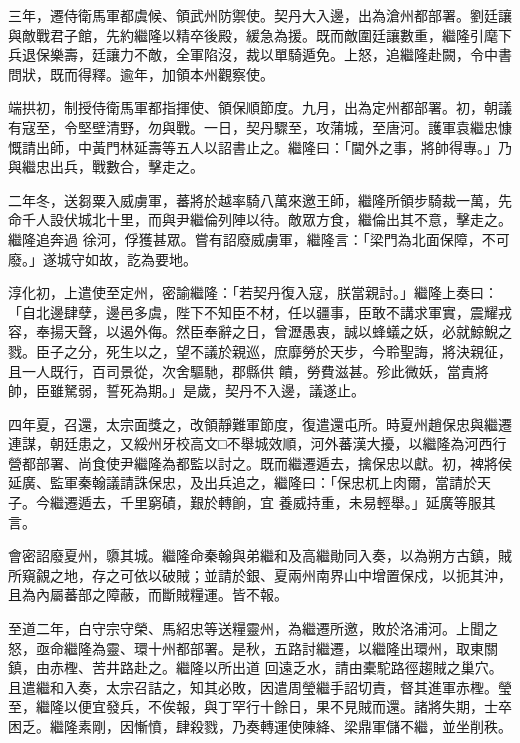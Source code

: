 \begin{pinyinscope}
 三年，遷侍衛馬軍都虞候、領武州防禦使。契丹大入邊，出為滄州都部署。劉廷讓與敵戰君子館，先約繼隆以精卒後殿，緩急為援。既而敵圍廷讓數重，繼隆引麾下兵退保樂壽，廷讓力不敵，全軍陷沒，裁以單騎遁免。上怒，追繼隆赴闕，令中書問狀，既而得釋。逾年，加領本州觀察使。



 端拱初，制授侍衛馬軍都指揮使、領保順節度。九月，出為定州都部署。初，朝議有寇至，令堅壁清野，勿與戰。一日，契丹驟至，攻蒲城，至唐河。護軍袁繼忠慷慨請出師，中黃門林延壽等五人以詔書止之。繼隆曰：「閫外之事，將帥得專。」乃與繼忠出兵，戰數合，擊走之。



 二年冬，送芻粟入威虜軍，蕃將於越率騎八萬來邀王師，繼隆所領步騎裁一萬，先命千人設伏城北十里，而與尹繼倫列陣以待。敵眾方食，繼倫出其不意，擊走之。繼隆追奔過
 徐河，俘獲甚眾。嘗有詔廢威虜軍，繼隆言：「梁門為北面保障，不可廢。」遂城守如故，訖為要地。



 淳化初，上遣使至定州，密諭繼隆：「若契丹復入寇，朕當親討。」繼隆上奏曰：「自北邊肆孽，邊邑多虞，陛下不知臣不材，任以疆事，臣敢不講求軍實，震耀戎容，奉揚天聲，以遏外侮。然臣奉辭之日，曾瀝愚衷，誠以蜂蟻之妖，必就鯨鯢之戮。臣子之分，死生以之，望不議於親巡，庶靡勞於天步，今聆聖誨，將決親征，且一人既行，百司景從，次舍驅馳，郡縣供
 饋，勞費滋甚。殄此微妖，當責將帥，臣雖駑弱，誓死為期。」是歲，契丹不入邊，議遂止。



 四年夏，召還，太宗面獎之，改領靜難軍節度，復遣還屯所。時夏州趙保忠與繼遷連謀，朝廷患之，又綏州牙校高文□不舉城效順，河外蕃漢大擾，以繼隆為河西行營都部署、尚食使尹繼隆為都監以討之。既而繼遷遁去，擒保忠以獻。初，裨將侯延廣、監軍秦翰議請誅保忠，及出兵追之，繼隆曰：「保忠杌上肉爾，當請於天子。今繼遷遁去，千里窮磧，艱於轉餉，宜
 養威持重，未易輕舉。」延廣等服其言。



 會密詔廢夏州，隳其城。繼隆命秦翰與弟繼和及高繼勛同入奏，以為朔方古鎮，賊所窺覦之地，存之可依以破賊；並請於銀、夏兩州南界山中增置保戍，以扼其沖，且為內屬蕃部之障蔽，而斷賊糧運。皆不報。



 至道二年，白守宗守榮、馬紹忠等送糧靈州，為繼遷所邀，敗於洛浦河。上聞之怒，亟命繼隆為靈、環十州都部署。是秋，五路討繼遷，以繼隆出環州，取東關鎮，由赤檉、苦井路赴之。繼隆以所出道
 回遠乏水，請由橐駝路徑趨賊之巢穴。且遣繼和入奏，太宗召詰之，知其必敗，因遣周瑩繼手詔切責，督其進軍赤檉。瑩至，繼隆以便宜發兵，不俟報，與丁罕行十餘日，果不見賊而還。諸將失期，士卒困乏。繼隆素剛，因慚憤，肆殺戮，乃奏轉運使陳絳、梁鼎軍儲不繼，並坐削秩。




\end{pinyinscope}
